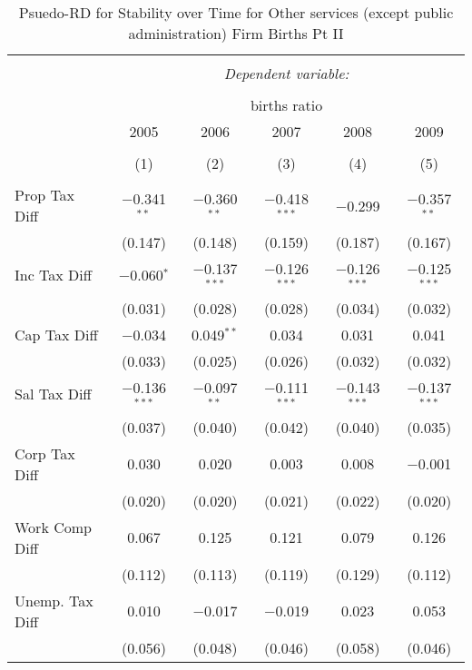 
\begin{table}[!htbp] \centering 
  \caption{Psuedo-RD for Stability over Time for  Other services (except public administration) Firm Births Pt II} 
  \label{81year} 
\small 
\begin{tabular}{@{\extracolsep{5pt}}lccccc} 
\\[-1.8ex]\hline 
\hline \\[-1.8ex] 
 & \multicolumn{5}{c}{\textit{Dependent variable:}} \\ 
\cline{2-6} 
\\[-1.8ex] & \multicolumn{5}{c}{births ratio} \\ 
 & 2005 & 2006 & 2007 & 2008 & 2009 \\ 
\\[-1.8ex] & (1) & (2) & (3) & (4) & (5)\\ 
\hline \\[-1.8ex] 
 Prop Tax Diff & $-$0.341$^{**}$ & $-$0.360$^{**}$ & $-$0.418$^{***}$ & $-$0.299 & $-$0.357$^{**}$ \\ 
  & (0.147) & (0.148) & (0.159) & (0.187) & (0.167) \\ 
  Inc Tax Diff & $-$0.060$^{*}$ & $-$0.137$^{***}$ & $-$0.126$^{***}$ & $-$0.126$^{***}$ & $-$0.125$^{***}$ \\ 
  & (0.031) & (0.028) & (0.028) & (0.034) & (0.032) \\ 
  Cap Tax Diff & $-$0.034 & 0.049$^{**}$ & 0.034 & 0.031 & 0.041 \\ 
  & (0.033) & (0.025) & (0.026) & (0.032) & (0.032) \\ 
  Sal Tax Diff & $-$0.136$^{***}$ & $-$0.097$^{**}$ & $-$0.111$^{***}$ & $-$0.143$^{***}$ & $-$0.137$^{***}$ \\ 
  & (0.037) & (0.040) & (0.042) & (0.040) & (0.035) \\ 
  Corp Tax Diff & 0.030 & 0.020 & 0.003 & 0.008 & $-$0.001 \\ 
  & (0.020) & (0.020) & (0.021) & (0.022) & (0.020) \\ 
  Work Comp Diff & 0.067 & 0.125 & 0.121 & 0.079 & 0.126 \\ 
  & (0.112) & (0.113) & (0.119) & (0.129) & (0.112) \\ 
  Unemp. Tax Diff & 0.010 & $-$0.017 & $-$0.019 & 0.023 & 0.053 \\ 
  & (0.056) & (0.048) & (0.046) & (0.058) & (0.046) \\ 

\end{tabular}
\end{table}
